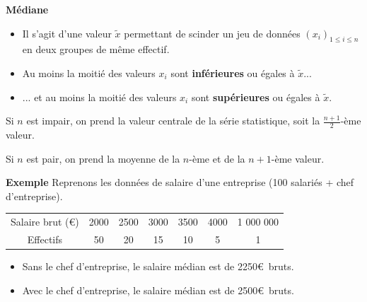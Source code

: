 \documentclass[aspectratio=169,xcolor=dvipsnames]{beamer}
\begin{document}
\begin{frame}
	\begin{block}{\textbf{Médiane}}
		\begin{itemize}
		\item Il s'agit d'une valeur $\widetilde{x}$ permettant de scinder un jeu de données $(x_i)_{1\leqslant i \leqslant n}$ en deux groupes de même effectif.
		\item Au moins la moitié des valeurs $x_i$ sont \textbf{inférieures} ou égales à $\widetilde{x}$...
		\item ... et au moins la moitié des valeurs $x_i$ sont \textbf{supérieures} ou égales à $\widetilde{x}$.
		\end{itemize}
	\end{block}
	
	\medskip
	
\textcolor{nyupurple}{\faCogs} Si $n$ est impair, on prend la valeur centrale de la série statistique, soit la $\frac{n+1}{2}$-ème valeur.

\textcolor{nyupurple}{\faCogs} Si $n$ est pair, on prend la moyenne de la $n$-ème et de la $n+1$-ème valeur.

\end{frame}

\begin{frame}
	\begin{exampleblock}{\textbf{Exemple}}
	Reprenons les données de salaire d'une entreprise (100 salariés + chef d'entreprise).
		\begin{center}
		\begin{tabular}{ccccccc}
		\hline
		Salaire brut (\euro) & 2000 & 2500 & 3000 & 3500 & 4000 & 1 000 000 \\
		Effectifs & 50 & 20 & 15 & 10 & 5 & 1 \\
		\hline
		\end{tabular}
		\end{center}
		\begin{itemize}
		\item Sans le chef d'entreprise, le salaire médian est de 2250\euro \ bruts.
		\item Avec le chef d'entreprise, le salaire médian est de  2500\euro \ bruts.
		\end{itemize}
	\end{exampleblock}
\end{frame}
\end{document}
